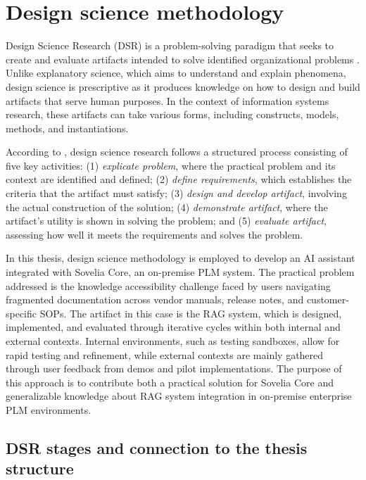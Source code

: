 \section{Design science methodology}
\label{sec:design-science-methodology}

Design Science Research (DSR) is a problem-solving paradigm that seeks to create and evaluate artifacts intended to solve identified organizational problems \parencite{johannessonIntroductionDesignScience2021}. Unlike explanatory science, which aims to understand and explain phenomena, design science is prescriptive as it produces knowledge on how to design and build artifacts that serve human purposes. In the context of information systems research, these artifacts can take various forms, including constructs, models, methods, and instantiations.

According to \textcite{johannessonIntroductionDesignScience2021}, design science research follows a structured process consisting of five key activities: (1) \emph{explicate problem}, where the practical problem and its context are identified and defined; (2) \emph{define requirements}, which establishes the criteria that the artifact must satisfy; (3) \emph{design and develop artifact}, involving the actual construction of the solution; (4) \emph{demonstrate artifact}, where the artifact's utility is shown in solving the problem; and (5) \emph{evaluate artifact}, assessing how well it meets the requirements and solves the problem.

In this thesis, design science methodology is employed to develop an AI assistant integrated with Sovelia Core, an on-premise PLM system. The practical problem addressed is the knowledge accessibility challenge faced by users navigating fragmented documentation across vendor manuals, release notes, and customer-specific SOPs. The artifact in this case is the RAG system, which is designed, implemented, and evaluated through iterative cycles within both internal and external contexts. Internal environments, such as testing sandboxes, allow for rapid testing and refinement, while external contexts are mainly gathered through user feedback from demos and pilot implementations. The purpose of this approach is to contribute both a practical solution for Sovelia Core and generalizable knowledge about RAG system integration in on-premise enterprise PLM environments.

\subsection{DSR stages and connection to the thesis structure}
\label{subsec:dsr-stages-connection}

